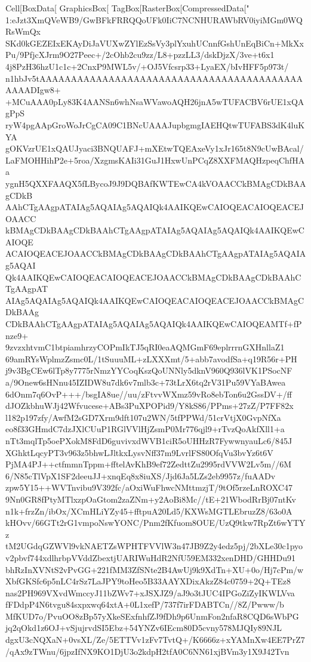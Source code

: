 {{Cell[BoxData[
 GraphicsBox[
  TagBox[RasterBox[CompressedData["
1:eJzt3XmQVeWB9/GwBFkFRRQQoUFk0IiC7NCNHURAWbRV0iyiMGm0WQRsWmQx
SKd0kGEZEIxEKAyDiJaVUXwZYlEzSsVy3plYxuhUCnnfGshUnEqBiCn+MkXx
Pu/9PfjcXJrm9O27Peec+/2cOhb2cu9zz/L8+pzzLL3/dskDjzX/3ve+t6x1
4j8PzH36hzU1c1c+2CnxP9MWL5v/+OJ5Vfcsrp33+LyaEX/bIvHFF5p973t/
n1hbJv5tAAAAAAAAAAAAAAAAAAAAAAAAAAAAAAAAAAAAAAAAAAAAAADIgw8+
+MCuAAA0pLy83K4AANSn6whNsaWVawoAQH26jnA5wTUFACBV6rUE1xQAgPpS
ryW4pgAApGroWoJrCgCA09C1BNcUAAAJupbgmgIAEHQtwTUFABS3dK4luKYA
gOKVzrUE1xQAUJyaci3BNQUAFJ+mXEtwTQEAxeVy1xJr165t8N9cUwBAcal/
LaFMOHHihP2e+5roa/XzgmsKAIi31GuJ1HxwUnPCqZ8XXFMAQHzpeqChfHAa
ygnH5QXXFAAQX5fLBycoJ9J9DQBAfKWTEwCA4kVOAACCkBMAgCDkBAAgCDkB
AAhCTgAAgpATAIAg5AQAIAg5AQAIQk4AAIKQEwCAIOQEACAIOQEACEJOAACC
kBMAgCDkBAAgCDkBAAhCTgAAgpATAIAg5AQAIAg5AQAIQk4AAIKQEwCAIOQE
ACAIOQEACEJOAACCkBMAgCDkBAAgCDkBAAhCTgAAgpATAIAg5AQAIAg5AQAI
Qk4AAIKQEwCAIOQEACAIOQEACEJOAACCkBMAgCDkBAAgCDkBAAhCTgAAgpAT
AIAg5AQAIAg5AQAIQk4AAIKQEwCAIOQEACAIOQEACEJOAACCkBMAgCDkBAAg
CDkBAAhCTgAAgpATAIAg5AQAIAg5AQAIQk4AAIKQEwCAIOQEAMTf+fPnze9+
9zvzxhtvmC1btpiamhrzyCOPmIkTJ5qRI0eaAQMGmF69eplrrrnGXHnllaZ1
69amRYsWplmzZsmc0L/1tSuuuML+zLXXXmt/5+abb7avodfSa+q19R56r+PH
j9v3BgCEw6lTp8y7775rNmzYYCoqKszQoUNNly5dknV960Q936lVK1PSocNF
a/9Onew6sHNnu45IZIDW8u7dk6v7mlb3c+73tLrX6tq2rV31Pu59VYaBAwea
6dOnm7q6OvP+++/bsgIA8ue//uu/zFtvvWXmz59vRo8ebTon6u2GssDV+/ff
dJOZkbhuWJj42Wfvucese+ABs3PuXPOPid9/Y8kS86/PPms+27zZ/P7FF82x
l182p197zfy/AwfM2sGD7Xrm9dft107u2WN/5tfPPWd/51crVtjX0GvpNfXa
eo8f33GHmdC7dzJXlCUuP1RGlVVlHjZsmP0Mr776qjl9+rTvzQoAkfXll1+a
nTt3mqlTp5oePXokM8FdD6guvivxdWVB1ciR5oUHHzR7FywwnyauLc6/845J
XGhktLqcyPT3v963z5bhwLJltkxLysvNff37m9LvrlFS80OfqVu3bvYz6t6V
PjMA4PJ++ctfmmnTppm+fftelAvKhB9ef72ZedttZu2995rdVVW2Lv5m//6M
6/N85cTlVpX1SF2deeuJJ+xnqEq8x8iuXS/Jjd6Ja5LZs2eb9957z/fuAADv
zpw5Y15++WVTnvibu9V392fc/aOxiWuFhwcNMttmzjT/9tOf5rzeLnROXC47
9Nn0GR8fPtyMTlxzpOaGtom2zaZNm+y2AoBi8Mc//tE+21WbodRrBj07ntKv
n1k+frzZn/ibOx/XCmHLiYZy45+fftpuA20Ld5/KXWsMGTLEbruzZ8/63o0A
kHOvv/66GTt2rG1vmpoNswYONC/Pnm2fKfuom8OUE/UzQ9tkw7RpZt6wYTYz
tM2UGdqGZWVl9vkNAETZsWPHTFVVlW3n47JB9Z2y4edz5pj/2bXLe30c1pyo
v2pbvf744xdlhrbpVVddZbextjUARIWuHdR2NfU59EM332xenDHD/GHHDu91
bhRzInXVNtS2vPvGG+221fMM3ZfSNte2B4AwUj9k9XdTn+XU+0o/Hj7cPm/w
XbfGKSfc6p5nLC4rSz7LaJPY9toHeo5B33AAYXDixAkzZ84c0759+2Q+TEz8
nas2PH969VXvdWmccyJ11bZWv7+xJSXJZ9/aJ9o3tJUC4IPGoZiZyIKWLVva
fFDdpP4N6tvgu84sxpxwq64xtA+0L1xefP/737f7irFDABTCn//8Z/Pwww/b
MfKUD7o/PvuOO8zBp57yXkeSExfnhfZJ9fDh9p6UnmFon2nfaR8CQD6sWbPG
jq2qOkd1z6OJ+vSjujrvdSI5Ebz+54YNZv6IEcm80D5cvny578MJQIy89NJL
dgxU3cNQXaN+0vsXL/Ze/5ETTVv1zFv7TvtQ+/K6666z+xYAMnXw4EE7PrZ7
/qAx9zTWnu/6jpzIfNX9KO1DjU3o2kdpH2tfA0C6NN61xjBVm3y1X9J42Tvn
}}
